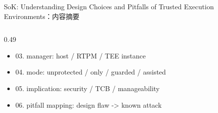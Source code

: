 \begin{frame}[t,shrink=6]{SoK: Understanding Design Choices and Pitfalls of Trusted Execution Environments：内容摘要}
\begin{columns}[T,totalwidth=\textwidth]
\begin{column}{0.49\textwidth}
{\begin{minipage}[t]{0.97\linewidth}
\begin{minipage}{0.92\linewidth}
\begin{itemize}
  \item 03. manager: host / RTPM / TEE instance
  \item 04. mode: unprotected / only / guarded / assisted
  \item 05. implication: security / TCB / manageability
  \item 06. pitfall mapping: design flaw -> known attack
\end{itemize}
    \end{minipage}
    \vspace{1mm}
  \end{minipage}}
  \end{column}
\end{columns}
\end{frame}


